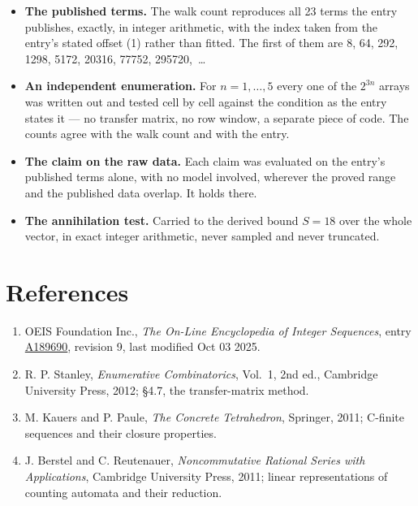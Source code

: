 \documentclass[11pt]{article}
\theoremstyle{definition}
\begin{document}
\begin{itemize}

\item {\bfseries The published terms.} The walk count reproduces all 23 terms the entry publishes, exactly, in integer arithmetic, with the index taken from the entry's stated offset (1) rather than fitted. The first of them are 8, 64, 292, 1298, 5172, 20316, 77752, 295720,~\dots

\item {\bfseries An independent enumeration.} For $n = 1,\dots,5$ every one of the $2^{3n}$ arrays was written out and tested cell by cell against the condition as the entry states it --- no transfer matrix, no row window, a separate piece of code. The counts agree with the walk count and with the entry.

\item {\bfseries The claim on the raw data.} Each claim was evaluated on the entry's published terms alone, with no model involved, wherever the proved range and the published data overlap. It holds there.

\item {\bfseries The annihilation test.} Carried to the derived bound $S = 18$ over the whole vector, in exact integer arithmetic, never sampled and never truncated.

\end{itemize}

\section{References}

\begin{enumerate}

\item OEIS Foundation Inc., \emph{The On-Line Encyclopedia of Integer Sequences}, entry \href{https://oeis.org/A189690}{A189690}, revision 9, last modified Oct 03 2025.

\item R. P. Stanley, \emph{Enumerative Combinatorics}, Vol.~1, 2nd ed., Cambridge University Press, 2012; \S4.7, the transfer-matrix method.

\item M. Kauers and P. Paule, \emph{The Concrete Tetrahedron}, Springer, 2011; C-finite sequences and their closure properties.

\item J. Berstel and C. Reutenauer, \emph{Noncommutative Rational Series with Applications}, Cambridge University Press, 2011; linear representations of counting automata and their reduction.

\end{enumerate}
\end{document}
